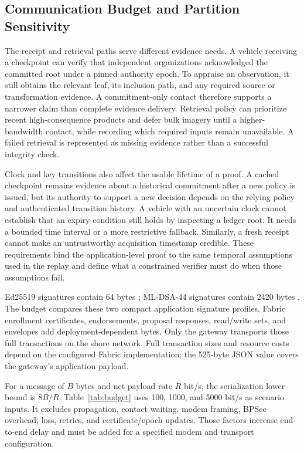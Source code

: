 \subsection{Communication Budget and Partition Sensitivity}\label{sec:budget}

The receipt and retrieval paths serve different evidence needs. A vehicle receiving a checkpoint can verify that independent organizations acknowledged the committed root under a pinned authority epoch. To appraise an observation, it still obtains the relevant leaf, its inclusion path, and any required source or transformation evidence. A commitment-only contact therefore supports a narrower claim than complete evidence delivery. Retrieval policy can prioritize recent high-consequence products and defer bulk imagery until a higher-bandwidth contact, while recording which required inputs remain unavailable. A failed retrieval is represented as missing evidence rather than a successful integrity check.

Clock and key transitions also affect the usable lifetime of a proof. A cached checkpoint remains evidence about a historical commitment after a new policy is issued, but its authority to support a new decision depends on the relying policy and authenticated transition history. A vehicle with an uncertain clock cannot establish that an expiry condition still holds by inspecting a ledger root. It needs a bounded time interval or a more restrictive fallback. Similarly, a fresh receipt cannot make an untrustworthy acquisition timestamp credible. These requirements bind the application-level proof to the same temporal assumptions used in the replay and define what a constrained verifier must do when those assumptions fail.

Ed25519 signatures contain 64 bytes \citep{rfc8032}; ML-DSA-44 signatures contain 2420 bytes \citep{fips204}. The budget compares these two compact application signature profiles. Fabric enrollment certificates, endorsements, proposal responses, read/write sets, and envelopes add deployment-dependent bytes. Only the gateway transports those full transactions on the shore network. Full transaction sizes and resource costs depend on the configured Fabric implementation; the 525-byte JSON value covers the gateway's application payload.

For a message of $B$ bytes and net payload rate $R$ bit/s, the serialization lower bound is $8B/R$. Table~\ref{tab:budget} uses 100, 1000, and 5000 bit/s as scenario inputs. It excludes propagation, contact waiting, modem framing, BPSec overhead, loss, retries, and certificate/epoch updates. Those factors increase end-to-end delay and must be added for a specified modem and transport configuration.

